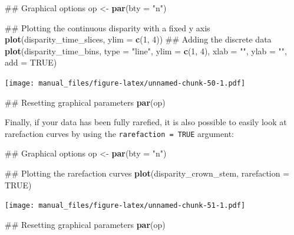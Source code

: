 \documentclass[]{book}
\newenvironment{Shaded}{\begin{snugshade}}{\end{snugshade}}
\newcommand{\KeywordTok}[1]{\textcolor[rgb]{0.13,0.29,0.53}{\textbf{#1}}}
\newcommand{\DataTypeTok}[1]{\textcolor[rgb]{0.13,0.29,0.53}{#1}}
\newcommand{\DecValTok}[1]{\textcolor[rgb]{0.00,0.00,0.81}{#1}}
\newcommand{\StringTok}[1]{\textcolor[rgb]{0.31,0.60,0.02}{#1}}
\newcommand{\OtherTok}[1]{\textcolor[rgb]{0.56,0.35,0.01}{#1}}
\newcommand{\NormalTok}[1]{#1}
\theoremstyle{definition}
\theoremstyle{definition}
\theoremstyle{remark}
\begin{document}
\begin{Shaded}
\begin{Highlighting}[]
\NormalTok{## Graphical options}
\NormalTok{op <-}\StringTok{ }\KeywordTok{par}\NormalTok{(}\DataTypeTok{bty =} \StringTok{"n"}\NormalTok{)}

\NormalTok{## Plotting the continuous disparity with a fixed y axis}
\KeywordTok{plot}\NormalTok{(disparity_time_slices, }\DataTypeTok{ylim =} \KeywordTok{c}\NormalTok{(}\DecValTok{1}\NormalTok{, }\DecValTok{4}\NormalTok{))}
\NormalTok{## Adding the discrete data}
\KeywordTok{plot}\NormalTok{(disparity_time_bins, }\DataTypeTok{type =} \StringTok{"line"}\NormalTok{, }\DataTypeTok{ylim =} \KeywordTok{c}\NormalTok{(}\DecValTok{1}\NormalTok{, }\DecValTok{4}\NormalTok{), }\DataTypeTok{xlab =} \StringTok{""}\NormalTok{, }\DataTypeTok{ylab =} \StringTok{""}\NormalTok{,}
    \DataTypeTok{add =} \OtherTok{TRUE}\NormalTok{)}
\end{Highlighting}
\end{Shaded}

\texttt{[image: manual\_files/figure-latex/unnamed-chunk-50-1.pdf]}

\begin{Shaded}
\begin{Highlighting}[]
\NormalTok{## Resetting graphical parameters}
\KeywordTok{par}\NormalTok{(op)}
\end{Highlighting}
\end{Shaded}

Finally, if your data has been fully rarefied, it is also possible to
easily look at rarefaction curves by using the
\texttt{rarefaction\ =\ TRUE} argument:

\begin{Shaded}
\begin{Highlighting}[]
\NormalTok{## Graphical options}
\NormalTok{op <-}\StringTok{ }\KeywordTok{par}\NormalTok{(}\DataTypeTok{bty =} \StringTok{"n"}\NormalTok{)}

\NormalTok{## Plotting the rarefaction curves}
\KeywordTok{plot}\NormalTok{(disparity_crown_stem, }\DataTypeTok{rarefaction =} \OtherTok{TRUE}\NormalTok{)}
\end{Highlighting}
\end{Shaded}

\texttt{[image: manual\_files/figure-latex/unnamed-chunk-51-1.pdf]}

\begin{Shaded}
\begin{Highlighting}[]
\NormalTok{## Resetting graphical parameters}
\KeywordTok{par}\NormalTok{(op)}
\end{Highlighting}
\end{Shaded}
\end{document}
